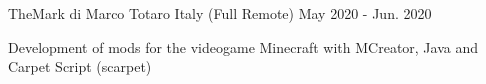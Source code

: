 \begin{cventries}
  {TheMark di Marco Totaro} %
  {Italy (Full Remote)} %
  {May 2020 - Jun. 2020} %
  { \begin{cvitems} %
  \item {Development of mods for the videogame Minecraft with MCreator, Java and Carpet Script (scarpet)}\end{cvitems} }
\end{cventries}
